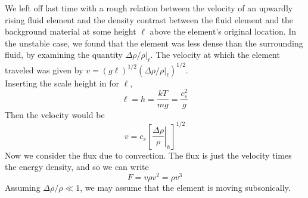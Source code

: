 \documentclass[10pt]{article}
\numberwithin{equation}{section}
\newcommand{\n}{\noindent}
\begin{document}
  We left off last time with a rough relation between the velocity of
  an upwardly rising fluid element and the density contrast between
  the fluid element and the background material at some height $\ell$
  above the element's original location. In the unstable case, we
  found that the element was less dense than the surrounding fluid,
  by examining the quantity $\Delta\rho/\rho|_{\ell}$. The velocity at
  which the element traveled was given by
  $v=(g\ell)^{1/2}(\Delta\rho/\rho|_\ell)^{1/2}$.\\

  \n Inserting the scale height in for $\ell$,
  \begin{equation}
    \label{eq:37}
    \ell=h=\frac{kT}{mg}=\frac{c_s^2}{g}
  \end{equation}
  Then the velocity would be
  \begin{equation}
    \label{eq:38}
    v=c_s\left[\left.\frac{\Delta\rho}{\rho}\right|_h\right]^{1/2}
  \end{equation}
  Now we consider the flux due to convection. The flux is just the
  velocity times the energy density, and so we can write
  \begin{equation}
    \label{eq:39}
    F=v\rho v^2=\rho v^3
  \end{equation}
  Assuming $\Delta\rho/\rho\ll 1$, we may
  assume that the element is moving subsonically.\\
\end{document}
